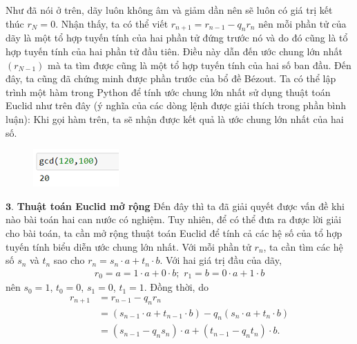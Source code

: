 	\begin{multicols}{2}
	Như đã nói ở trên, dãy luôn không âm và giảm dần nên sẽ luôn có giá trị kết thúc $r_N=0$. Nhận thấy, ta có thể viết $r_{n+1}=r_{n-1}-q_n r_n$ nên mỗi phần tử của dãy là một tổ hợp tuyến tính của hai phần tử đứng trước nó và do đó cũng là tổ hợp tuyến tính của hai phần tử đầu tiên. Điều này dẫn đến ước chung lớn nhất $(r_{N-1})$ mà ta tìm được cũng là một tổ hợp tuyến tính của hai số ban đầu. Đến đây, ta cũng đã chứng minh được phần trước của bổ đề Bézout.
	\vskip 0.1cm
	Ta có thể lập trình một hàm trong Python để tính ước chung lớn nhất sử dụng thuật toán Euclid như trên đây (ý nghĩa của các dòng lệnh được giải thích trong phần bình luận):
	\vskip 0.1cm
	Khi gọi hàm trên, ta sẽ nhận được kết quả là ước chung lớn nhất của hai số.
	\begin{figure}[H]
		\centering
		\vspace*{-10pt}
		\captionsetup{labelformat= empty, justification=centering}
		\includegraphics[width=0.4\linewidth]{3}
		\vspace*{-15pt}
	\end{figure}
	$\pmb{3.}$ \textbf{\color{hoccungpi}Thuật toán Euclid mở rộng}
	\vskip 0.1cm
	Đến đây thì ta đã giải quyết được vấn đề khi nào bài toán hai can nước có nghiệm. Tuy nhiên, để có thể đưa ra được lời giải cho bài toán, ta cần mở rộng thuật toán Euclid để tính cả các hệ số của tổ hợp tuyến tính biểu diễn ước chung lớn nhất. Với mỗi phần tử $r_n$, ta cần tìm các hệ số $s_n$ và $t_n$ sao cho $r_n=s_n\cdot a+t_n\cdot b$.
	\vskip 0.1cm
	Với hai giá trị đầu của dãy,
	\setlength{\abovedisplayskip}{5pt}
	\setlength{\belowdisplayskip}{5pt}
	\begin{align*}
		r_0=a=1\cdot a\!+\!0\cdot b;\,\,
		r_1=b=0\cdot a\!+\!1\cdot b
	\end{align*}
	nên $s_0=1$, $t_0=0$, $s_1=0$, $t_1=1$.
	\vskip 0.1cm
	Đồng thời, do
	\begin{align*}
		r_{n+1}&=r_{n-1}-q_n r_n\\
		&=\left(s_{n\!-\!1}\!\cdot\! a+t_{n-1}\!\cdot\! b\right)-q_n \left(s_n\!\cdot\! a+t_n\!\cdot \!b\right)\\
		&=\left(s_{n-1}-q_n s_n \right)\cdot a+\left(t_{n-1}-q_n t_n \right)\cdot b. 
	\end{align*}

\end{multicols}
